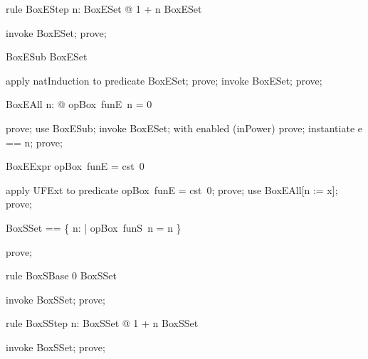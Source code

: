 \documentclass{article}
\begin{document}
\begin{theorem}{rule BoxEStep}
  \forall n: BoxESet @ 1 + n \in BoxESet
\end{theorem}

\begin{zproof}
invoke BoxESet;
prove;
\end{zproof}

\begin{theorem}{BoxESub}
  \nat \subseteq BoxESet
\end{theorem}

\begin{zproof}
apply natInduction to predicate \nat \subseteq BoxESet;
prove;
invoke BoxESet;
prove;
\end{zproof}

\begin{theorem}{BoxEAll}
  \forall n: \nat @ opBox~funE~n = 0
\end{theorem}

\begin{zproof}
prove;
use BoxESub;
invoke BoxESet;
with enabled (inPower) prove;
instantiate e == n;
prove;
\end{zproof}

\begin{theorem}{BoxEExpr}
  opBox~funE = cst~0
\end{theorem}

\begin{zproof}
apply UFExt to predicate opBox~funE = cst~0;
prove;
use BoxEAll[n := x];
prove;
\end{zproof}

\begin{zed}
  BoxSSet == \{ n: \nat | opBox~funS~n = n \}
\end{zed}

\begin{zproof}
prove;
\end{zproof}

\begin{theorem}{rule BoxSBase}
  0 \in BoxSSet
\end{theorem}

\begin{zproof}
invoke BoxSSet;
prove;
\end{zproof}

\begin{theorem}{rule BoxSStep}
  \forall n: BoxSSet @ 1 + n \in BoxSSet
\end{theorem}

\begin{zproof}
invoke BoxSSet;
prove;
\end{zproof}
\end{document}
